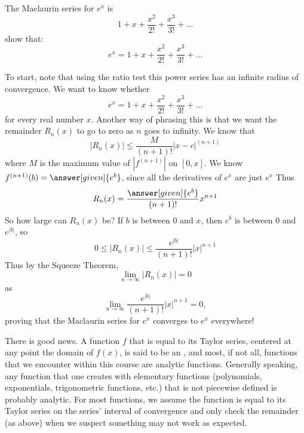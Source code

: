 \documentclass{ximera}
\begin{document}
\begin{example}
	The Maclaurin series for $e^x$ is 
	\[
	1+x+\frac{x^2}{2!} +\frac{x^3}{3!}+\dots
	\]
        show that:
        \[
        e^x = 1+x+\frac{x^2}{2!} +\frac{x^3}{3!}+\dots
        \]
	\begin{explanation}
	  To start, note that using the ratio test this power series
          has an infinite radius of convergence.  We want to know
          whether
          \[
          e^x = 1+x+\frac{x^2}{2!} +\frac{x^3}{3!}+\dots
          \]
          for every real number $x$.  Another way of phrasing this is
          that we want the remainder $R_n(x)$ to go to zero as $n$
          goes to infinity. We know that
          \[
          \left|R_n(x)\right| \le \frac{M}{(n+1)!}|x-c|^{(n+1)}
          \]
          where $M$ is the maximum value of $|f^{(n+1)}|$ on $[0,x]$.
          We know $f^{(n+1)}(b) = \answer[given]{e^b}$, since all the
          derivatives of $e^x$ are just $e^x$ Thus
	  \[
	  R_n(x) = \frac{\answer[given]{e^b}}{(n+1)!}x^{n+1}
	  \]
	  So how large can $R_n(x)$ be?  If $b$ is between $0$ and
          $x$, then $e^b$ is between $0$ and $e^{|b|}$, so
	  \[
	  0\le \left| R_n(x)\right| \leq \frac{e^{|b|}}{(n+1)!}|x|^{n+1}
	  \]
	  Thus by the Squeeze Theorem,
	  \[
	  \lim_{n \to \infty}\left| R_n(x)\right| = 0
          \]
          as
          \[
          \lim_{n \to \infty} \frac{e^{|b|}}{(n+1)!}|x|^{n+1} = 0,
	  \]
	  proving that the Maclaurin series for $e^x$ converges to
          $e^x$ everywhere!
        \end{explanation}
\end{example}

There is good news. A function $f$ that is equal to its Taylor series,
centered at any point the domain of $f(x)$, is said to be an
, and most, if not all, functions that we
encounter within this course are analytic functions. Generally
speaking, any function that one creates with elementary functions
(polynomials, exponentials, trigonometric functions, etc.) that is not
piecewise defined is probably analytic. For most functions, we assume
the function is equal to its Taylor series on the series' interval of
convergence and only check the remainder (as above) when we suspect
something may not work as expected.

\end{document}
